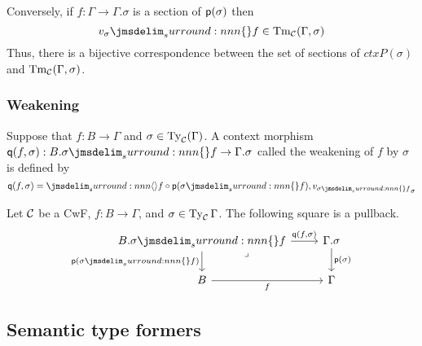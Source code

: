 \documentclass[a4paper]{article}
\begin{document}
Conversely, if $f : \Gamma \to \Gamma.\sigma$ is a section of $\operatorname{\mathsf{p}}(\sigma)$ then
\[
  \semSubst{v_{\sigma}}{f} \in \Tm{\cC}(\Gamma,\sigma)
\]
Thus, there is a bijective correspondence between the set of sections of $ctxP(\sigma)$ and $\operatorname{Tm}_{\mathcal{C}}(\Gamma,\sigma)$.

\subsubsection{Weakening}\label{sec:w}

Suppose that $f : B \to \Gamma$ and $\sigma \in \operatorname{Ty}_{\mathcal{C}}(\Gamma)$.
A context morphism $\ctxQ(f,\sigma) : B.\semSubst{\sigma}{f} \to \Gamma.\sigma$ called the weakening of $f$ by $\sigma$ is defined by
\[
  \ctxQ(f,\sigma) = \semComp{f \circ \ctxP(\semSubst{\sigma}{f})}{v_{\semSubst{\sigma}{f}}}{\sigma}
\]

\begin{proposition}
  Let $\mathcal{C}$ be a CwF, $f : B \to \Gamma$, and $\sigma \in \operatorname{Ty}_{\mathcal{C}}{\Gamma}$.
  The following square is a pullback.
  \[\begin{tikzcd}
      {B.\semSubst{\sigma}{f}} & {\Gamma.\sigma} \\
      B & \Gamma
      \arrow["{\ctxQ(f,\sigma)}", from=1-1, to=1-2]
      \arrow["{\ctxP(\semSubst{\sigma}{f})}"', from=1-1, to=2-1]
      \arrow["\lrcorner"{anchor=center, pos=0.125}, draw=none, from=1-1, to=2-2]
      \arrow["{\ctxP(\sigma)}", from=1-2, to=2-2]
      \arrow["f"', from=2-1, to=2-2]
    \end{tikzcd}\]
\end{proposition}

\subsection{Semantic type formers}\label{sec:stf}
\end{document}
